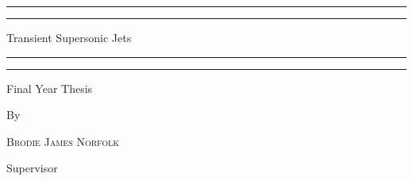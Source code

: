  

\begin{titlepage} %

	\centering %
	
	\scshape %
	
	\vspace*{3\baselineskip} %
	
	
	\rule{\textwidth}{1.6pt}\vspace*{-\baselineskip}\vspace*{2pt} %
	\rule{\textwidth}{0.4pt} %
	
	\vspace{1.5\baselineskip} %
	
	{\LARGE Transient Supersonic Jets} %
	
	\vspace{1.5\baselineskip} %
	
	\rule{\textwidth}{0.4pt}\vspace*{-\baselineskip}\vspace{3.2pt} %
	\rule{\textwidth}{1.6pt} %
	
	\vspace{2\baselineskip} %
	
	
	{\Large Final Year Thesis} %
	
	\vspace*{3\baselineskip} %
	
	
	By
	
	\vspace{0.5\baselineskip} %
	
	{\scshape\Large Brodie James Norfolk} %
	
	\vspace{2\baselineskip}
	Supervisor
	

\end{titlepage}
